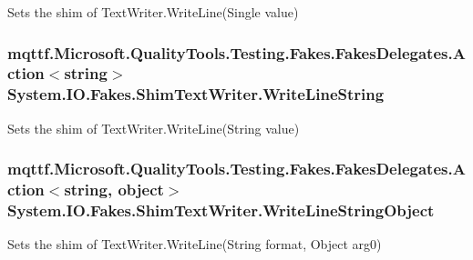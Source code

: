 Sets the shim of Text\-Writer.\-Write\-Line(\-Single value)

\hypertarget{class_system_1_1_i_o_1_1_fakes_1_1_shim_text_writer_a6d293f12bc3a6cd348db16c706046aff}{
\subsubsection[{Write\-Line\-String}]{\setlength{\rightskip}{0pt plus 5cm}mqttf.\-Microsoft.\-Quality\-Tools.\-Testing.\-Fakes.\-Fakes\-Delegates.\-Action$<$string$>$ System.\-I\-O.\-Fakes.\-Shim\-Text\-Writer.\-Write\-Line\-String\hspace{0.3cm}{\ttfamily [set]}}}\label{class_system_1_1_i_o_1_1_fakes_1_1_shim_text_writer_a6d293f12bc3a6cd348db16c706046aff}


Sets the shim of Text\-Writer.\-Write\-Line(\-String value)

\hypertarget{class_system_1_1_i_o_1_1_fakes_1_1_shim_text_writer_aa08e4c36295eb5f2047f0f8e4c399a9c}{
\subsubsection[{Write\-Line\-String\-Object}]{\setlength{\rightskip}{0pt plus 5cm}mqttf.\-Microsoft.\-Quality\-Tools.\-Testing.\-Fakes.\-Fakes\-Delegates.\-Action$<$string, object$>$ System.\-I\-O.\-Fakes.\-Shim\-Text\-Writer.\-Write\-Line\-String\-Object\hspace{0.3cm}{\ttfamily [set]}}}\label{class_system_1_1_i_o_1_1_fakes_1_1_shim_text_writer_aa08e4c36295eb5f2047f0f8e4c399a9c}


Sets the shim of Text\-Writer.\-Write\-Line(\-String format, Object arg0)

